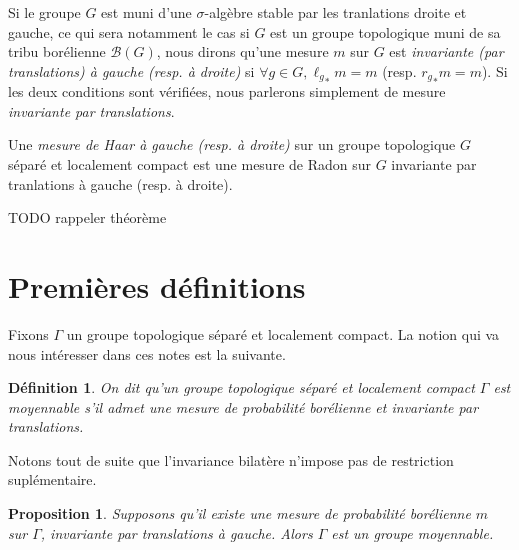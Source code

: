 \documentclass[a4paper,12pt]{article}
\newtheorem{prop}[theorem]{Proposition}
\newtheorem{definition}[theorem]{Définition}
\newcommand{\Bor}{\mathcal{B}}
\begin{document}
Si le groupe $G$ est muni d'une $\sigma$-algèbre stable par les tranlations droite et gauche, ce qui sera notamment le cas
si $G$ est un groupe topologique muni de sa tribu borélienne $\Bor(G)$, nous dirons qu'une mesure $m$ sur $G$ est \textit{invariante
(par translations) à gauche (resp. à droite)} si $\forall g\in G, {\ell_g}_*m = m$ (resp. ${r_g}_*m = m$). Si les deux conditions
sont vérifiées, nous parlerons simplement de mesure \textit{invariante par translations}.

Une \textit{mesure de Haar à gauche (resp. à droite)} sur un groupe topologique $G$ séparé et localement compact est une mesure de
Radon sur $G$ invariante par tranlations à gauche (resp. à droite).

TODO rappeler théorème

\section{Premières définitions}

Fixons $\Gamma$ un groupe topologique séparé et localement compact. La notion qui va nous intéresser dans ces notes est la suivante.

\begin{definition}
    On dit qu'un groupe topologique séparé et localement compact $\Gamma$ est \emph{moyennable} s'il admet une 
    mesure de probabilité borélienne et invariante par translations.
\end{definition}

Notons tout de suite que l'invariance bilatère n'impose pas de restriction suplémentaire. 
\begin{prop}
    Supposons qu'il existe une mesure de probabilité borélienne $m$ sur $\Gamma$, invariante par translations à gauche.
    Alors $\Gamma$ est un groupe moyennable.
\end{prop} 
\end{document}
